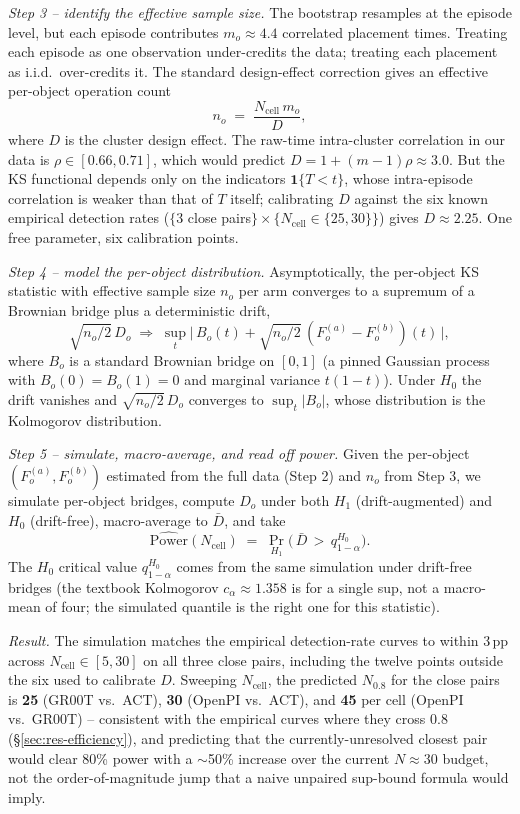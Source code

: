 \documentclass{article}
\begin{document}
\emph{Step 3 -- identify the effective sample size.} The bootstrap resamples at the episode level, but each episode contributes $m_o \approx 4.4$ correlated placement times. Treating each episode as one observation under-credits the data; treating each placement as i.i.d.\ over-credits it. The standard design-effect correction gives an effective per-object operation count
\[
n_o \;=\; \frac{N_\text{cell}\,m_o}{D},
\]
where $D$ is the cluster design effect. The raw-time intra-cluster correlation in our data is $\rho \in [0.66, 0.71]$, which would predict $D = 1 + (m{-}1)\rho \approx 3.0$. But the KS functional depends only on the indicators $\mathbf{1}\{T < t\}$, whose intra-episode correlation is weaker than that of $T$ itself; calibrating $D$ against the six known empirical detection rates ($\{$3 close pairs$\}\times\{N_\text{cell} \in \{25, 30\}\}$) gives $D \approx 2.25$. One free parameter, six calibration points.

\emph{Step 4 -- model the per-object distribution.} Asymptotically, the per-object KS statistic with effective sample size $n_o$ per arm converges to a supremum of a Brownian bridge plus a deterministic drift,
\[
\sqrt{n_o/2}\,D_o \;\Rightarrow\; \sup_t \bigl|\,B_o(t) + \sqrt{n_o/2}\,(F^{(a)}_o - F^{(b)}_o)(t)\,\bigr|,
\]
where $B_o$ is a standard Brownian bridge on $[0,1]$ (a pinned Gaussian process with $B_o(0) = B_o(1) = 0$ and marginal variance $t(1-t)$). Under $H_0$ the drift vanishes and $\sqrt{n_o/2}\,D_o$ converges to $\sup_t|B_o|$, whose distribution is the Kolmogorov distribution.

\emph{Step 5 -- simulate, macro-average, and read off power.} Given the per-object $(F^{(a)}_o, F^{(b)}_o)$ estimated from the full data (Step 2) and $n_o$ from Step 3, we simulate per-object bridges, compute $D_o$ under both $H_1$ (drift-augmented) and $H_0$ (drift-free), macro-average to $\bar D$, and take
\[
\widehat{\text{Power}}(N_\text{cell}) \;=\; \Pr_{H_1}\!\bigl(\,\bar D \,>\, q_{1-\alpha}^{H_0}\bigr).
\]
The $H_0$ critical value $q_{1-\alpha}^{H_0}$ comes from the same simulation under drift-free bridges (the textbook Kolmogorov $c_\alpha \approx 1.358$ is for a single sup, not a macro-mean of four; the simulated quantile is the right one for this statistic).

\emph{Result.} The simulation matches the empirical detection-rate curves to within 3\,pp across $N_\text{cell} \in [5, 30]$ on all three close pairs, including the twelve points outside the six used to calibrate $D$. Sweeping $N_\text{cell}$, the predicted $N_{0.8}$ for the close pairs is \textbf{25} (GR00T vs.\ ACT), \textbf{30} (OpenPI vs.\ ACT), and \textbf{45} per cell (OpenPI vs.\ GR00T) -- consistent with the empirical curves where they cross 0.8 (\S\ref{sec:res-efficiency}), and predicting that the currently-unresolved closest pair would clear 80\% power with a $\sim$50\% increase over the current $N{\approx}30$ budget, not the order-of-magnitude jump that a naive unpaired sup-bound formula would imply.
\end{document}
